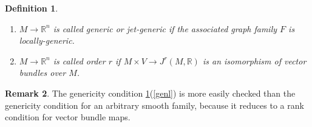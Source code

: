 \documentclass[12pt]{article}
\numberwithin{equation}{section}
\theoremstyle{plain}
\newtheorem{definition}{Definition}[section]
\theoremstyle{definition}
\newtheorem{remark}[definition]{Remark}
\newcommand{\R}{\mathbb{R}}
\newcommand{\ra}{\rightarrow}
\begin{document}
\begin{definition}\label{propsl}\
\begin{enumerate}
\itemsep0em
\item{\label{genl}$M\ra \R^{n}$ is called \emph{generic} or \emph{jet-generic} if the associated graph family $F$ is locally-generic.}
\item{$M\ra \R^{n}$ is called \emph{order $r$} if $M\times V\ra J^{r}(M,\R)$ is an isomorphism of vector bundles over $M$.}
\end{enumerate}
\end{definition}
\begin{remark}The genericity condition \ref{propsl}(\ref{genl}) is more easily checked than the genericity condition for an arbitrary smooth family, because it reduces to a rank condition for vector bundle maps.
\end{remark}
\end{document}
